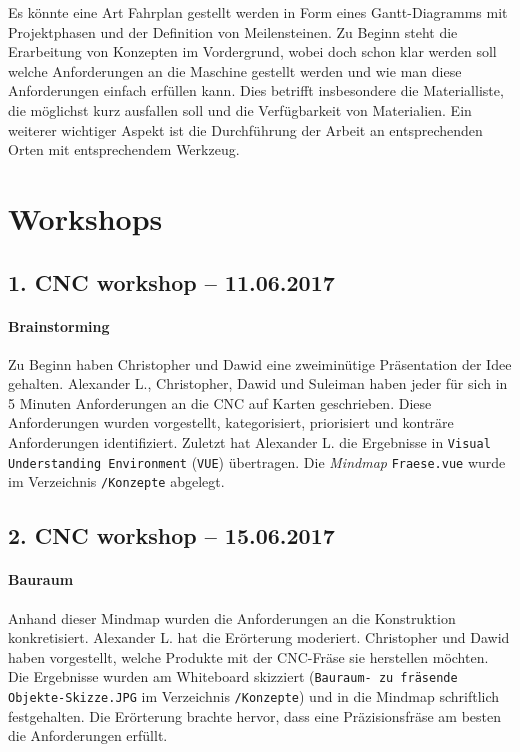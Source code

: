 \documentclass[
	a4paper,
	smallheadings,
	german,
	]
	{scrreprt}
\begin{document}
Es könnte eine Art Fahrplan gestellt werden in Form eines Gantt-Diagramms mit Projektphasen und der Definition von Meilensteinen.
Zu Beginn steht die Erarbeitung von Konzepten im Vordergrund, wobei doch schon klar werden soll welche Anforderungen an die Maschine gestellt werden und wie man diese Anforderungen einfach erfüllen kann.
Dies betrifft insbesondere die Materialliste, die möglichst kurz ausfallen soll und die Verfügbarkeit von Materialien.
Ein weiterer wichtiger Aspekt ist die Durchführung der Arbeit an entsprechenden Orten mit entsprechendem Werkzeug.

\section{Workshops}
\subsection{1. CNC workshop -- 11.06.2017}
\paragraph{Brainstorming}
Zu Beginn haben Christopher und Dawid eine zweiminütige Präsentation der Idee gehalten.
Alexander L., Christopher, Dawid und Suleiman haben jeder für sich in 5 Minuten Anforderungen an die CNC auf Karten geschrieben.
Diese Anforderungen wurden vorgestellt, kategorisiert, priorisiert und konträre Anforderungen identifiziert.
Zuletzt hat Alexander L. die Ergebnisse in \texttt{Visual Understanding Environment} (\texttt{VUE}) übertragen.
Die \textit{Mindmap} \texttt{Fraese.vue} wurde im Verzeichnis \texttt{/Konzepte} abgelegt.

\subsection{2. CNC workshop -- 15.06.2017}
\paragraph{Bauraum}
Anhand dieser Mindmap wurden die Anforderungen an die Konstruktion konkretisiert.
Alexander L. hat die Erörterung moderiert.
Christopher und Dawid haben vorgestellt, welche Produkte mit der CNC-Fräse sie herstellen möchten.
Die Ergebnisse wurden am Whiteboard skizziert (\texttt{Bauraum- zu fräsende Objekte-Skizze.JPG} im Verzeichnis \texttt{/Konzepte}) und in die Mindmap schriftlich festgehalten.
Die Erörterung brachte hervor, dass eine Präzisionsfräse am besten die Anforderungen erfüllt.
\end{document}
